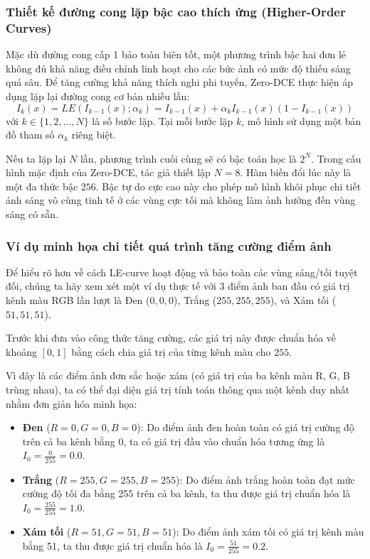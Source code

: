 \documentclass[a4paper]{article}
\begin{document}
\subsubsection{Thiết kế đường cong lặp bậc cao thích ứng (Higher-Order Curves)}
Mặc dù đường cong cấp 1 bảo toàn biên tốt, một phương trình bậc hai đơn lẻ không đủ khả năng điều chỉnh linh hoạt cho các bức ảnh có mức độ thiếu sáng quá sâu. Để tăng cường khả năng thích nghi phi tuyến, Zero-DCE thực hiện áp dụng lặp lại đường cong cơ bản nhiều lần:
\begin{equation}
    I_k(x) = LE(I_{k-1}(x); \alpha_k) = I_{k-1}(x) + \alpha_k I_{k-1}(x)(1 - I_{k-1}(x))
\end{equation}
với $k \in \{1, 2, ..., N\}$ là số bước lặp. Tại mỗi bước lặp $k$, mô hình sử dụng một bản đồ tham số $\alpha_k$ riêng biệt.

Nếu ta lặp lại $N$ lần, phương trình cuối cùng sẽ có bậc toán học là $2^N$. Trong cấu hình mặc định của Zero-DCE, tác giả thiết lập $N = 8$. Hàm biến đổi lúc này là một đa thức bậc $256$. Bậc tự do cực cao này cho phép mô hình khôi phục chi tiết ánh sáng vô cùng tinh tế ở các vùng cực tối mà không làm ảnh hưởng đến vùng sáng có sẵn.

\subsubsection{Ví dụ minh họa chi tiết quá trình tăng cường điểm ảnh}
Để hiểu rõ hơn về cách LE-curve hoạt động và bảo toàn các vùng sáng/tối tuyệt đối, chúng ta hãy xem xét một ví dụ thực tế với 3 điểm ảnh ban đầu có giá trị kênh màu RGB lần lượt là Đen ($0, 0, 0$), Trắng ($255, 255, 255$), và Xám tối ($51, 51, 51$). 

Trước khi đưa vào công thức tăng cường, các giá trị này được chuẩn hóa về khoảng $[0, 1]$ bằng cách chia giá trị của từng kênh màu cho $255$. 

Vì đây là các điểm ảnh đơn sắc hoặc xám (có giá trị của ba kênh màu R, G, B trùng nhau), ta có thể đại diện giá trị tính toán thông qua một kênh duy nhất nhằm đơn giản hóa minh họa:
\begin{itemize}
    \item \textbf{Đen} ($R=0, G=0, B=0$): Do điểm ảnh đen hoàn toàn có giá trị cường độ trên cả ba kênh bằng 0, ta có giá trị đầu vào chuẩn hóa tương ứng là $I_0 = \frac{0}{255} = 0.0$.
    \item \textbf{Trắng} ($R=255, G=255, B=255$): Do điểm ảnh trắng hoàn toàn đạt mức cường độ tối đa bằng 255 trên cả ba kênh, ta thu được giá trị chuẩn hóa là $I_0 = \frac{255}{255} = 1.0$.
    \item \textbf{Xám tối} ($R=51, G=51, B=51$): Do điểm ảnh xám tối có giá trị kênh màu bằng 51, ta thu được giá trị chuẩn hóa là $I_0 = \frac{51}{255} = 0.2$.
\end{itemize}
\end{document}
